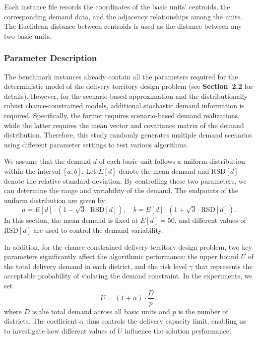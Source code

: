 \documentclass[preprint,12pt,authoryear]{elsarticle}
\begin{document}
Each instance file records the coordinates of the basic units’ centroids, the corresponding demand data, and the adjacency relationships among the units. The Euclidean distance between centroids is used as the distance between any two basic units.

\subsubsection{Parameter Description}

The benchmark instances already contain all the parameters required for the deterministic model of the delivery territory design problem (see \textbf{Section~2.2} for details). However, for the scenario-based approximation and the distributionally robust chance-constrained models, additional stochastic demand information is required. Specifically, the former requires scenario-based demand realizations, while the latter requires the mean vector and covariance matrix of the demand distribution. Therefore, this study randomly generates multiple demand scenarios using different parameter settings to test various algorithms.

We assume that the demand $d$ of each basic unit follows a uniform distribution within the interval $\left[a, b\right]$. Let $E[d]$ denote the mean demand and $\mathrm{RSD}[d]$ denote the relative standard deviation. By controlling these two parameters, we can determine the range and variability of the demand. The endpoints of the uniform distribution are given by:
\begin{equation}
a = E[d] \cdot \left(1 - \sqrt{3} \cdot \mathrm{RSD}[d]\right), \quad
b = E[d] \cdot \left(1 + \sqrt{3} \cdot \mathrm{RSD}[d]\right).
\end{equation}
In this section, the mean demand is fixed at $E[d] = 50$, and different values of $\mathrm{RSD}[d]$ are used to control the demand variability.

In addition, for the chance-constrained delivery territory design problem, two key parameters significantly affect the algorithmic performance: the upper bound $U$ of the total delivery demand in each district, and the risk level $\gamma$ that represents the acceptable probability of violating the demand constraint. In the experiments, we set
\begin{equation}
U = (1 + \alpha) \cdot \frac{D}{p},
\end{equation}
where $D$ is the total demand across all basic units and $p$ is the number of districts. The coefficient $\alpha$ thus controls the delivery capacity limit, enabling us to investigate how different values of $U$ influence the solution performance.
\end{document}
